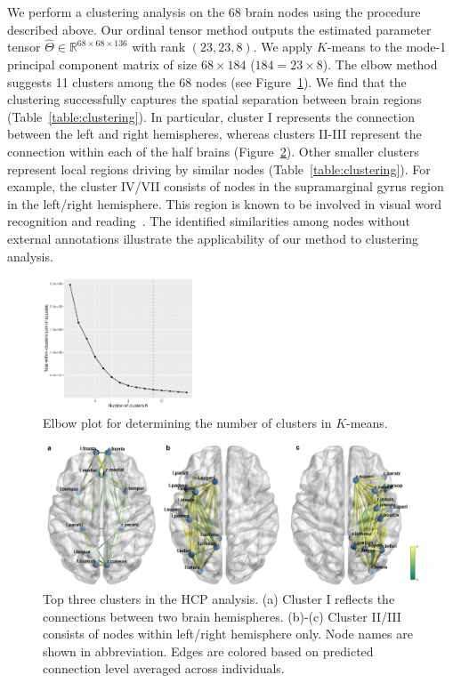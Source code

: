 \documentclass{article}
\theoremstyle{plain}
\theoremstyle{definition}
\begin{document}
We perform a clustering analysis on the 68 brain nodes using the procedure described above. Our ordinal tensor method outputs the estimated parameter tensor $\hat\Theta\in\mathbb{R}^{68\times 68\times136}$ with rank $(23,23,8)$. We apply $K$-means to the mode-1 principal component matrix of size $68\times 184$ ($184=23\times8$). The elbow method suggests 11 clusters among the 68 nodes (see Figure~\ref{figure:elbow}). We find that the clustering successfully captures the spatial separation between brain regions (Table~\ref{table:clustering}).
In particular, cluster I represents the connection between the left and right hemispheres, whereas clusters II-III represent the connection within each of the half brains (Figure~\ref{figure:brain image}). Other smaller clusters represent local regions driving by similar nodes (Table~\ref{table:clustering}). For example, the cluster IV/VII consists of nodes in the supramarginal gyrus region in the left/right hemisphere. This region is known to be involved in visual word recognition and reading~\citep{stoeckel2009supramarginal}. The identified similarities among nodes without external annotations illustrate the applicability of our method to clustering analysis.

\begin{figure}[ht]
\begin{center}
\includegraphics[width=0.4\textwidth]{elbowm.pdf}
\end{center}
\caption{Elbow plot for determining the number of clusters in $K$-means.}\label{figure:elbow}
\end{figure}


\begin{figure}[H]
\centering
\includegraphics[width = .7\textwidth]{HCP.pdf}
\caption{Top three clusters in the HCP analysis. (a) Cluster I reflects the connections between two brain hemispheres. (b)-(c) Cluster II/III consists of nodes within left/right hemisphere only. Node names are shown in abbreviation. Edges are colored based on predicted connection level averaged across individuals. }  \label{figure:brain image}
\end{figure}
\end{document}
